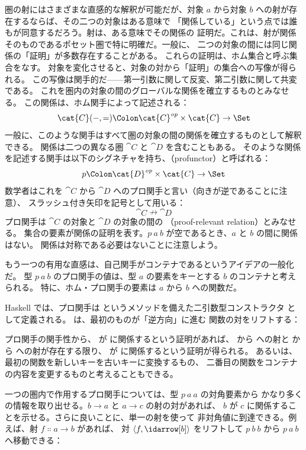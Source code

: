 
\lettrine[lhang=0.17]{圏}{の射にはさまざまな直感的な解釈が可能だが}、対象
$a$ から対象 $b$ への射が存在するならば、その二つの対象はある意味で
「関係している」という点では誰もが同意するだろう。射は、ある意味でその関係の
証明だ。これは、射が関係そのものであるポセット圏で特に明確だ。一般に、
二つの対象の間には同じ関係の「証明」が多数存在することがある。
これらの証明は、ホム集合と呼ぶ集合をなす。
対象を変化させると、対象の対から「証明」の集合への写像が得られる。
この写像は関手的だ——第一引数に関して反変、第二引数に関して共変である。
これを圏内の対象の間のグローバルな関係を確立するものとみなせる。
この関係は、ホム関手によって記述される：
\[\cat{C}(-, =) \Colon \cat{C}^\mathit{op}\times{}\cat{C} \to \Set\]
一般に、このような関手はすべて圏の対象の間の関係を確立するものとして解釈できる。
関係は二つの異なる圏 $\cat{C}$ と $\cat{D}$ を含むこともある。
そのような関係を記述する関手は以下のシグネチャを持ち、（profunctor）と呼ばれる：
\[p \Colon \cat{D}^\mathit{op}\times{}\cat{C} \to \Set\]
数学者はこれを $\cat{C}$ から $\cat{D}$ へのプロ関手と言い（向きが逆であることに注意）、
スラッシュ付き矢印を記号として用いる：
\[\cat{C} \nrightarrow \cat{D}\]
プロ関手は $\cat{C}$ の対象と $\cat{D}$ の対象の間の
（proof-relevant relation）とみなせる。
集合の要素が関係の証明を表す。$p\ a\ b$ が空であるとき、$a$ と $b$ の間に関係はない。
関係は対称である必要はないことに注意しよう。

もう一つの有用な直感は、自己関手がコンテナであるというアイデアの一般化だ。
型 $p\ a\ b$ のプロ関手の値は、型 $a$ の要素をキーとする $b$ のコンテナと考えられる。
特に、ホム・プロ関手の要素は $a$ から $b$ への関数だ。

Haskell では、プロ関手は  というメソッドを備えた二引数型コンストラクタ
 として定義される。 は、最初のものが「逆方向」に進む
関数の対をリフトする：

プロ関手の関手性から、 が  に関係するという証明があれば、
 から  への射と  から  への射が存在する限り、
 が  に関係するという証明が得られる。
あるいは、最初の関数を新しいキーを古いキーに変換するもの、
二番目の関数をコンテナの内容を変更するものと考えることもできる。

一つの圏内で作用するプロ関手については、型 $p\ a\ a$ の対角要素から
かなり多くの情報を取り出せる。$b \to a$ と $a \to c$ の射の対があれば、
$b$ が $c$ に関係することを示せる。さらに良いことに、単一の射を使って
非対角値に到達できる。例えば、射 $f \Colon a \to b$ があれば、
対 $\langle f, \idarrow[b] \rangle$ をリフトして $p\ b\ b$ から
$p\ a\ b$ へ移動できる：

